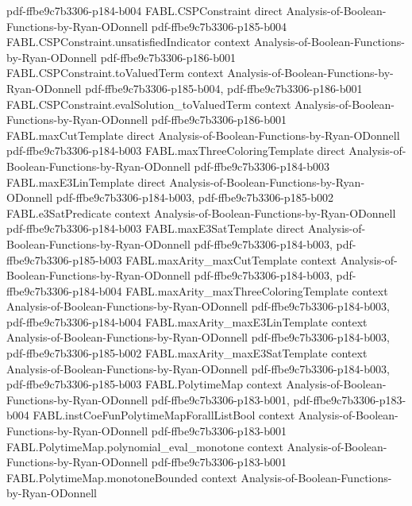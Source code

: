 \begin{theorem}
  {pdf-ffbe9c7b3306-p184-b004}
\proofstep
  {FABL.CSPConstraint}
  {direct}
  {Analysis-of-Boolean-Functions-by-Ryan-ODonnell}
  {pdf-ffbe9c7b3306-p185-b004}
\proofstep
  {FABL.CSPConstraint.unsatisfiedIndicator}
  {context}
  {Analysis-of-Boolean-Functions-by-Ryan-ODonnell}
  {pdf-ffbe9c7b3306-p186-b001}
\proofstep
  {FABL.CSPConstraint.toValuedTerm}
  {context}
  {Analysis-of-Boolean-Functions-by-Ryan-ODonnell}
  {pdf-ffbe9c7b3306-p185-b004,
    pdf-ffbe9c7b3306-p186-b001}
\proofstep
  {FABL.CSPConstraint.evalSolution_toValuedTerm}
  {context}
  {Analysis-of-Boolean-Functions-by-Ryan-ODonnell}
  {pdf-ffbe9c7b3306-p186-b001}
\proofstep
  {FABL.maxCutTemplate}
  {direct}
  {Analysis-of-Boolean-Functions-by-Ryan-ODonnell}
  {pdf-ffbe9c7b3306-p184-b003}
\proofstep
  {FABL.maxThreeColoringTemplate}
  {direct}
  {Analysis-of-Boolean-Functions-by-Ryan-ODonnell}
  {pdf-ffbe9c7b3306-p184-b003}
\proofstep
  {FABL.maxE3LinTemplate}
  {direct}
  {Analysis-of-Boolean-Functions-by-Ryan-ODonnell}
  {pdf-ffbe9c7b3306-p184-b003,
    pdf-ffbe9c7b3306-p185-b002}
\proofstep
  {FABL.e3SatPredicate}
  {context}
  {Analysis-of-Boolean-Functions-by-Ryan-ODonnell}
  {pdf-ffbe9c7b3306-p184-b003}
\proofstep
  {FABL.maxE3SatTemplate}
  {direct}
  {Analysis-of-Boolean-Functions-by-Ryan-ODonnell}
  {pdf-ffbe9c7b3306-p184-b003,
    pdf-ffbe9c7b3306-p185-b003}
\proofstep
  {FABL.maxArity_maxCutTemplate}
  {context}
  {Analysis-of-Boolean-Functions-by-Ryan-ODonnell}
  {pdf-ffbe9c7b3306-p184-b003,
    pdf-ffbe9c7b3306-p184-b004}
\proofstep
  {FABL.maxArity_maxThreeColoringTemplate}
  {context}
  {Analysis-of-Boolean-Functions-by-Ryan-ODonnell}
  {pdf-ffbe9c7b3306-p184-b003,
    pdf-ffbe9c7b3306-p184-b004}
\proofstep
  {FABL.maxArity_maxE3LinTemplate}
  {context}
  {Analysis-of-Boolean-Functions-by-Ryan-ODonnell}
  {pdf-ffbe9c7b3306-p184-b003,
    pdf-ffbe9c7b3306-p185-b002}
\proofstep
  {FABL.maxArity_maxE3SatTemplate}
  {context}
  {Analysis-of-Boolean-Functions-by-Ryan-ODonnell}
  {pdf-ffbe9c7b3306-p184-b003,
    pdf-ffbe9c7b3306-p185-b003}
\proofstep
  {FABL.PolytimeMap}
  {context}
  {Analysis-of-Boolean-Functions-by-Ryan-ODonnell}
  {pdf-ffbe9c7b3306-p183-b001,
    pdf-ffbe9c7b3306-p183-b004}
\proofstep
  {FABL.instCoeFunPolytimeMapForallListBool}
  {context}
  {Analysis-of-Boolean-Functions-by-Ryan-ODonnell}
  {pdf-ffbe9c7b3306-p183-b001}
\proofstep
  {FABL.PolytimeMap.polynomial_eval_monotone}
  {context}
  {Analysis-of-Boolean-Functions-by-Ryan-ODonnell}
  {pdf-ffbe9c7b3306-p183-b001}
\proofstep
  {FABL.PolytimeMap.monotoneBounded}
  {context}
  {Analysis-of-Boolean-Functions-by-Ryan-ODonnell}

\end{theorem}
